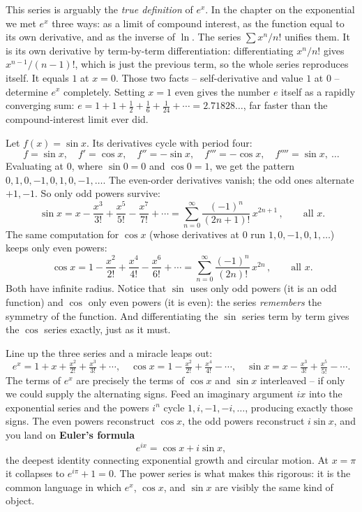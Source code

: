 \begin{happeningbox}
This series is arguably the \emph{true definition} of $e^x$. In the chapter on the exponential we met $e^x$ three ways: as a limit of compound interest, as the function equal to its own derivative, and as the inverse of $\ln$. The series $\sum x^n/n!$ unifies them. It is its own derivative by term-by-term differentiation: differentiating $x^n/n!$ gives $x^{n-1}/(n-1)!$, which is just the previous term, so the whole series reproduces itself. It equals $1$ at $x=0$. Those two facts -- self-derivative and value $1$ at $0$ -- determine $e^x$ completely. Setting $x=1$ even gives the number $e$ itself as a rapidly converging sum: $e = 1 + 1 + \tfrac12 + \tfrac16 + \tfrac1{24} + \cdots = 2.71828\ldots$, far faster than the compound-interest limit ever did.
\end{happeningbox}

\begin{example}
\label{ch30:ex-sin-cos}
Let $f(x) = \sin x$. Its derivatives cycle with period four:
\[
  f = \sin x,\quad f' = \cos x,\quad f'' = -\sin x,\quad f''' = -\cos x,\quad f'''' = \sin x,\ \dots
\]
Evaluating at $0$, where $\sin 0 = 0$ and $\cos 0 = 1$, we get the pattern $0, 1, 0, -1, 0, 1, 0, -1, \dots$. The even-order derivatives vanish; the odd ones alternate $+1, -1$. So only odd powers survive:
\[
  \boxed{\,\sin x = x - \frac{x^3}{3!} + \frac{x^5}{5!} - \frac{x^7}{7!} + \cdots
  = \sum_{n=0}^{\infty}\frac{(-1)^n}{(2n+1)!}\,x^{2n+1}\,}, \qquad \text{all } x.
\]
The same computation for $\cos x$ (whose derivatives at $0$ run $1, 0, -1, 0, 1, \dots$) keeps only even powers:
\[
  \boxed{\,\cos x = 1 - \frac{x^2}{2!} + \frac{x^4}{4!} - \frac{x^6}{6!} + \cdots
  = \sum_{n=0}^{\infty}\frac{(-1)^n}{(2n)!}\,x^{2n}\,}, \qquad \text{all } x.
\]
Both have infinite radius. Notice that $\sin$ uses only odd powers (it is an odd function) and $\cos$ only even powers (it is even): the series \emph{remembers} the symmetry of the function. And differentiating the $\sin$ series term by term gives the $\cos$ series exactly, just as it must.
\end{example}

\begin{connectionbox}
Line up the three series and a miracle leaps out:
\[
  e^x = 1 + x + \tfrac{x^2}{2!} + \tfrac{x^3}{3!} + \cdots,\quad
  \cos x = 1 - \tfrac{x^2}{2!} + \tfrac{x^4}{4!} - \cdots,\quad
  \sin x = x - \tfrac{x^3}{3!} + \tfrac{x^5}{5!} - \cdots.
\]
The terms of $e^x$ are precisely the terms of $\cos x$ and $\sin x$ interleaved -- if only we could supply the alternating signs. Feed an imaginary argument $ix$ into the exponential series and the powers $i^n$ cycle $1, i, -1, -i, \dots$, producing exactly those signs. The even powers reconstruct $\cos x$, the odd powers reconstruct $i\sin x$, and you land on \textbf{Euler's formula}
\[
  e^{ix} = \cos x + i \sin x,
\]
the deepest identity connecting exponential growth and circular motion. At $x=\pi$ it collapses to $e^{i\pi} + 1 = 0$. The power series is what makes this rigorous: it is the common language in which $e^x$, $\cos x$, and $\sin x$ are visibly the same kind of object.
\end{connectionbox}

